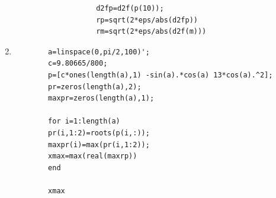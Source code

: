 \documentclass[11pt,a4paper]{article}
\begin{document}
\begin{enumerate}
\begin{enumerate}
\begin{verbatim}
				d2fp=d2f(p(10));
				rp=sqrt(2*eps/abs(d2fp))
				rm=sqrt(2*eps/abs(d2f(m)))
			\end{verbatim}
	\end{enumerate}
	
	\item
	\begin{verbatim}
		a=linspace(0,pi/2,100)';
		c=9.80665/800;
		p=[c*ones(length(a),1) -sin(a).*cos(a) 13*cos(a).^2];
		pr=zeros(length(a),2);  
		maxpr=zeros(length(a),1);  

		for i=1:length(a)
		pr(i,1:2)=roots(p(i,:));
		maxpr(i)=max(pr(i,1:2));
		xmax=max(real(maxrp))
		end

		xmax
	\end{verbatim}
	
\end{enumerate}
\end{document}

